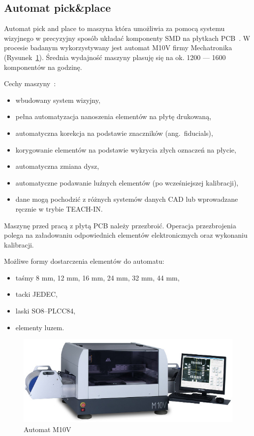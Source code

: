 \subsection{Automat pick\&place}
Automat pick and place to maszyna która umożliwia za pomocą systemu wizyjnego w precyzyjny sposób układać komponenty SMD na płytkach PCB~\cite{automatp&p1}. W procesie badanym wykorzystywany jest automat M10V firmy Mechatronika (Rysunek~\ref{automat_pick_place}). Średnia wydajność maszyny plasuję się na ok. 1200 --- 1600 komponentów na godzinę.

Cechy maszyny~\cite{automatp&p2}:
\begin{itemize}
	\item wbudowany system wizyjny,
	\item pełna automatyzacja nanoszenia elementów na płytę drukowaną,
	\item automatyczna korekcja na podstawie znaczników (ang.\ fiducials),
	\item korygowanie elementów na podstawie wykrycia złych oznaczeń na płycie,
	\item automatyczna zmiana dysz,
	\item automatyczne podawanie luźnych elementów (po wcześniejszej kalibracji),
	\item dane mogą pochodzić z różnych systemów danych CAD lub wprowadzane ręcznie w trybie TEACH-IN\@.
\end{itemize}

Maszynę przed pracą z płytą PCB należy przezbroić. Operacja przezbrojenia polega na załadowaniu odpowiednich elementów elektronicznych oraz wykonaniu kalibracji.

Możliwe formy dostarczenia elementów do automatu:
\begin{itemize}
	\item taśmy 8 mm, 12 mm, 16 mm, 24 mm, 32 mm, 44 mm,
	\item tacki JEDEC,
	\item laski SO8–PLCC84,
	\item elementy luzem.
\end{itemize}

\begin{figure}[H]
	\centering
	\includegraphics[scale=0.45]{./chapters/chapter2/M10V.jpeg}
	\caption{Automat M10V~\cite{automatp&p2}}
	\label{automat_pick_place}
\end{figure}



